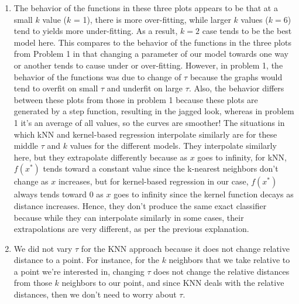 \documentclass[submit]{harvardml}
\begin{document}
\begin{solution}
\begin{enumerate}
        \item The behavior of the functions in these three plots appears to be that at a small $k$ value ($k$ = 1), there is more over-fitting, while larger $k$ values ($k = 6$) tend to yields more under-fitting. As a result, $k=2$ case tends to be the best model here. This compares to the behavior of the functions in the three plots from Problem 1 in that changing a parameter of our model towards one way or another tends to cause under or over-fitting. However, in problem 1, the behavior of the functions was due to change of $\tau$ because the graphs would tend to overfit on small $\tau$ and underfit on large $\tau$. Also, the behavior differs between these plots from those in problem 1 because these plots are generated by a step function, resulting in the jagged look, whereas in problem 1 it's an average of all values, so the curves are smoother!
        The situations in which kNN and kernel-based regression interpolate similarly are for these middle $\tau$ and $k$ values for the different models. They interpolate similarly here, but they extrapolate differently because as $x$ goes to infinity, for kNN, $f(x^*)$  tends toward a constant value since the k-nearest neighbors don't change as $x$ increases, but for kernel-based regression in our case, $f(x^*)$ always tends toward 0 as $x$ goes to infinity since the kernel function decays as distance increases. Hence, they don't produce the same exact classifier because while they can interpolate similarly in some cases, their extrapolations are very different, as per the previous explanation.
        
        \item We did not vary $\tau$ for the KNN approach because it does not change relative distance to a point. For instance, for the $k$ neighbors that we take relative to a point we're interested in, changing $\tau$ does not change the relative distances from those $k$ neighbors to our point, and since KNN deals with the relative distances, then we don't need to worry about $\tau$.
        
    \end{enumerate}

\end{solution}

\newpage 

\end{document}
